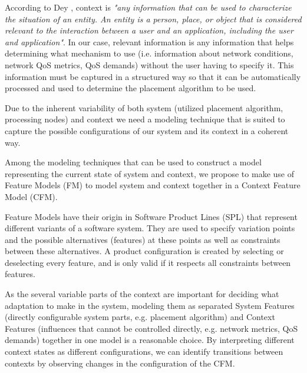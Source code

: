 According to Dey \cite{}, context is \textit{"any information that can be used to characterize the situation of an entity. An entity is a person, place, or object that is considered relevant to the interaction between a user and an application, including the user and application"}. %
In our case, relevant information is any information that helps determining what mechanism to use (i.e. information about network conditions, network QoS metrics, QoS demands) without the user having to specify it.
This information must be captured in a structured way so that it can be automatically processed and used to determine the placement algorithm to be used. 
 
Due to the inherent variability of both system (utilized placement algorithm, processing nodes) and context we need a modeling technique that is suited to capture the possible configurations of our system and its context in a coherent way.
 
 Among the modeling techniques that can be used to construct a model representing the current state of system and context, we propose to make use of Feature Models (FM) to model system and context together in a Context Feature Model (CFM). %

Feature Models have their origin in Software Product Lines (SPL) that represent different variants of a software system. They are used to specify variation points and the possible alternatives (features) at these points as well as constraints between these alternatives. A product configuration is created by 
 selecting or deselecting every feature, and is only valid if it respects all constraints between features.
 
 As the several variable parts of the context are important for deciding what adaptation to make in the system, modeling them as separated System Features (directly configurable system parts, e.g. placement algorithm) and Context Features (influences that cannot be controlled directly, e.g. network metrics, QoS demands) together in one model is a reasonable choice.
 By interpreting different context states as different configurations, we can identify transitions between contexts by observing changes in the configuration of the CFM. 
 
